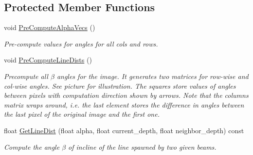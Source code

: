 \subsection*{Protected Member Functions}
\begin{DoxyCompactItemize}
\item 
\mbox{\label{classdepth__clustering_1_1LineDistDiffPrecomputed_a9e52e2a94d9f92567953a765475d62a0}} 
void \hyperlink{classdepth__clustering_1_1LineDistDiffPrecomputed_a9e52e2a94d9f92567953a765475d62a0}{Pre\+Compute\+Alpha\+Vecs} ()
\begin{DoxyCompactList}\small\item\em Pre-\/compute values for angles for all cols and rows. \end{DoxyCompactList}\item 
void \hyperlink{classdepth__clustering_1_1LineDistDiffPrecomputed_a9d0211af30be1f60ef4e8db570128a7b}{Pre\+Compute\+Line\+Dists} ()
\begin{DoxyCompactList}\small\item\em Precompute all $\beta$ angles for the image. It generates two matrices for row-\/wise and col-\/wise angles. See picture for illustration. The squares store values of angles between pixels with computation direction shown by arrows. Note that the columns matrix wraps around, i.\+e. the last element stores the difference in angles between the last pixel of the original image and the first one. \end{DoxyCompactList}\item 
float \hyperlink{classdepth__clustering_1_1LineDistDiffPrecomputed_a2725113f6eb03b937104f325adf0c7aa}{Get\+Line\+Dist} (float alpha, float current\+\_\+depth, float neighbor\+\_\+depth) const
\begin{DoxyCompactList}\small\item\em Compute the angle $\beta$ of incline of the line spawned by two given beams. \end{DoxyCompactList}\end{DoxyCompactItemize}
